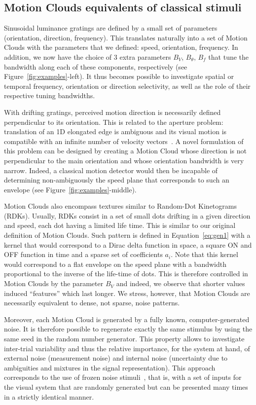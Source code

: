 \documentclass[a4paper,11pt]{article}%
\begin{document}
\subsection{Motion Clouds equivalents of classical stimuli}
Sinusoidal luminance gratings are defined by a small set of parameters (orientation, direction, frequency). This translates naturally into a set of Motion Clouds with the parameters that we defined: speed, orientation, frequency. In addition, we now have the choice of 3 extra parameters $B_{V}$, $B_\theta$, $B_{f}$ that tune the bandwidth along each of these components, respectively (see Figure~\ref{fig:examples}-left). It thus becomes possible to investigate spatial or temporal frequency, orientation or direction selectivity, as well as the role of their respective tuning bandwidths. %

With drifting gratings, perceived motion direction is necessarily defined perpendicular to its orientation. This is related to the aperture problem: translation of an 1D elongated edge is ambiguous and its visual motion is compatible with an infinite number of velocity vectors~\citep{Movshon85}. A novel formulation of this problem can be designed by creating a Motion Cloud whose direction is not perpendicular to the main orientation and whose orientation bandwidth is very narrow. Indeed, a classical motion detector would then be incapable of determining non-ambiguously the speed plane that corresponds to such an envelope (see Figure~\ref{fig:examples}-middle). %

Motion Clouds also encompass textures similar to Random-Dot Kinetograms (RDKs). Usually, RDKs consist in a set of small dots drifting in a given direction and speed, each dot having a limited life time. This is similar to our original definition of Motion Clouds. Such pattern is defined in Equation~\ref{eq:gen1} with a kernel that would correspond to a Dirac delta function in space, a square ON and OFF function in time and a sparse set of coefficients $a_i$. Note that this kernel would correspond to a flat envelope on the speed plane with a bandwidth proportional to the inverse of the life-time of dots. This is therefore controlled in Motion Clouds by the parameter $B_{V}$ and indeed, we observe that shorter values induced ``features'' which last longer. We stress, however, that Motion Clouds are necessarily equivalent to dense, not sparse, noise patterns. %

Moreover, each Motion Cloud is generated by a fully known, computer-generated noise. It is therefore possible to regenerate exactly the same stimulus by using the same seed in the random number generator. This property allows to investigate inter-trial variability and thus the relative importance, for the system at hand, of external noise (measurement noise) and internal noise (uncertainty due to ambiguities and mixtures in the signal representation). This approach corresponds to the use of frozen noise stimuli~\citep{Mainen95}, that is, with a set of inputs for the visual system that are randomly generated but can be presented many times in a strictly identical manner. %
\end{document}
